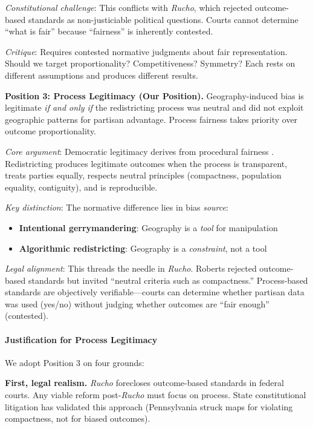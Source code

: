 \textit{Constitutional challenge}: This conflicts with \textit{Rucho}, which rejected outcome-based standards as non-justiciable political questions. Courts cannot determine ``what is fair'' because ``fairness'' is inherently contested.

\textit{Critique}: Requires contested normative judgments about fair representation. Should we target proportionality? Competitiveness? Symmetry? Each rests on different assumptions and produces different results.

\textbf{Position 3: Process Legitimacy (Our Position).}
Geography-induced bias is legitimate \textit{if and only if} the redistricting process was neutral and did not exploit geographic patterns for partisan advantage. Process fairness takes priority over outcome proportionality.

\textit{Core argument}: Democratic legitimacy derives from procedural fairness \citep{rawls1971}. Redistricting produces legitimate outcomes when the process is transparent, treats parties equally, respects neutral principles (compactness, population equality, contiguity), and is reproducible.

\textit{Key distinction}: The normative difference lies in bias \textit{source}:
\begin{itemize}
\item \textbf{Intentional gerrymandering}: Geography is a \textit{tool} for manipulation
\item \textbf{Algorithmic redistricting}: Geography is a \textit{constraint}, not a tool
\end{itemize}

\textit{Legal alignment}: This threads the needle in \textit{Rucho}. Roberts rejected outcome-based standards but invited ``neutral criteria such as compactness.'' Process-based standards are objectively verifiable---courts can determine whether partisan data was used (yes/no) without judging whether outcomes are ``fair enough'' (contested).

\paragraph{Justification for Process Legitimacy}

We adopt Position 3 on four grounds:

\textbf{First, legal realism.} \textit{Rucho} forecloses outcome-based standards in federal courts. Any viable reform post-\textit{Rucho} must focus on process. State constitutional litigation has validated this approach (Pennsylvania struck maps for violating compactness, not for biased outcomes).

